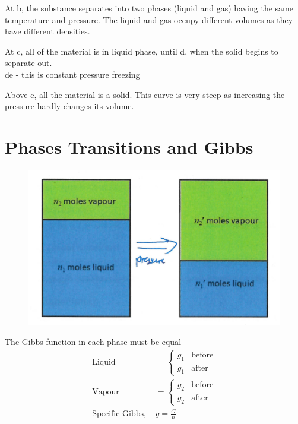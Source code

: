 \documentclass[a4paper, 11pt, normalem]{report}
\begin{document}
At b, the substance separates into two phases (liquid and gas) having the same temperature and pressure. The liquid and gas occupy different volumes as they have different densities.

At c, all of the material is in liquid phase, until d, when the solid begins to separate out. \\
de - this is constant pressure freezing

Above e, all the material is a solid. This curve is very steep as increasing the pressure hardly changes its volume.

\section{Phases Transitions and Gibbs}
\begin{figure}
    \begin{center}
        \vspace{-30pt}
        \includegraphics[scale=0.4]{GibbsPhase.png}
        \vspace{-100pt}
    \end{center}
\end{figure}
The Gibbs function in each phase must be equal
\begin{align*}
    \text{Liquid} &= \begin{cases} g_1 & \text{before} \\ g_1 & \text{after} \end{cases} \\
    \text{Vapour} &= \begin{cases} g_2 & \text{before} \\ g_2 & \text{after} \end{cases} \\
    \text{Specific Gibbs, }& g = \frac{G}{n}
\end{align*}
\end{document}
